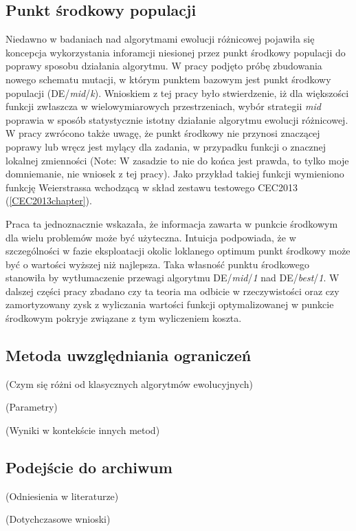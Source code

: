 \documentclass[12pt,a4paper]{report}
\begin{document}
{{{\subsection{Punkt środkowy populacji}
\label{MidPoint}
\par{
Niedawno w badaniach nad algorytmami ewolucji różnicowej \cite{DEmid} pojawiła się koncepcja wykorzystania inforamcji niesionej przez punkt środkowy populacji do poprawy sposobu działania algorytmu. W pracy \cite{DEmid} podjęto próbę zbudowania nowego schematu mutacji, w którym punktem bazowym jest punkt środkowy populacji (DE/\emph{mid}/\emph{k}). Wnioskiem z tej pracy było stwierdzenie, iż dla większości funkcji zwłaszcza w wielowymiarowych przestrzeniach, wybór strategii \emph{mid} poprawia w sposób statystycznie istotny działanie algorytmu ewolucji różnicowej. W pracy zwrócono także uwagę, że punkt środkowy nie przynosi znaczącej poprawy lub wręcz jest mylący dla zadania, w przypadku funkcji o znacznej lokalnej zmienności (Note: W zasadzie to nie do końca jest prawda, to tylko moje domniemanie, nie wniosek z tej pracy). Jako przykład takiej funkcji wymieniono funkcję Weierstrassa wchodzącą w skład zestawu testowego CEC2013 (\ref{CEC2013chapter}).
}
\par{
Praca ta jednoznacznie wskazała, że informacja zawarta w punkcie środkowym dla wielu problemów może być użyteczna. Intuicja podpowiada, że w szczególności w fazie eksploatacji okolic loklanego optimum punkt środkowy może być o wartości wyższej niż najlepsza. Taka własność punktu środkowego stanowiła by wytłumaczenie przewagi algorytmu DE/\emph{mid}/\emph{1} nad DE/\emph{best}/\emph{1}. W dalszej części pracy zbadano czy ta teoria ma odbicie w rzeczywistości oraz czy zamortyzowany zysk z wyliczania wartości funkcji optymalizowanej w punkcie środkowym pokryje związane z tym wyliczeniem koszta.
}
\subsection{Metoda uwzględniania ograniczeń}

\par{
(Czym się różni od klasycznych algorytmów ewolucyjnych)
}
\par{
(Parametry)
}
\par{
(Wyniki w kontekście innych metod)
}

\subsection{Podejście do archiwum}
\par{(Odniesienia w literaturze)}
\par{(Dotychczasowe wnioski)}

}}}
\end{document}
